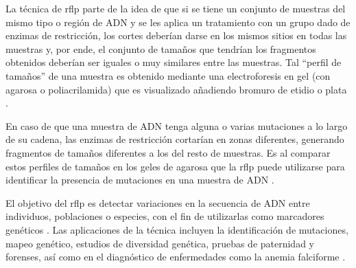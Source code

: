 \documentclass{AsignaturaResumen}
\begin{document}
La técnica de \acrshort{rflp} parte de la idea de que si se tiene un conjunto de muestras del mismo tipo o región de ADN y se les aplica un tratamiento con un grupo dado de enzimas de restricción, los cortes deberían darse en los mismos sitios en todas las muestras y, por ende, el conjunto de tamaños que tendrían los fragmentos obtenidos deberían ser iguales o muy similares entre las muestras. Tal ``perfil de tamaños'' de una muestra es obtenido mediante una electroforesis en gel (con agarosa o poliacrilamida) que es visualizado añadiendo bromuro de etidio o plata \citep{tarachApplicationPolymeraseChain2021}.

En caso de que una muestra de ADN tenga alguna o varias mutaciones a lo largo de su cadena, las enzimas de restricción cortarían en zonas diferentes, generando fragmentos de tamaños diferentes a los del resto de muestras. Es al comparar estos perfiles de tamaños en los geles de agarosa que la \acrshort{rflp} puede utilizarse para identificar la presencia de mutaciones en una muestra de ADN \citep{tarachApplicationPolymeraseChain2021,hashimExploringPotentialLimitations2019}.


El objetivo del \acrshort{rflp} es detectar variaciones en la secuencia de ADN entre individuos, poblaciones o especies, con el fin de utilizarlas como marcadores genéticos \citep{tarachApplicationPolymeraseChain2021}. Las aplicaciones de la técnica incluyen la identificación de mutaciones, mapeo genético, estudios de diversidad genética, pruebas de paternidad y forenses, así como en el diagnóstico de enfermedades como la anemia falciforme \citep{tarachApplicationPolymeraseChain2021,hashimExploringPotentialLimitations2019}.
\end{document}
